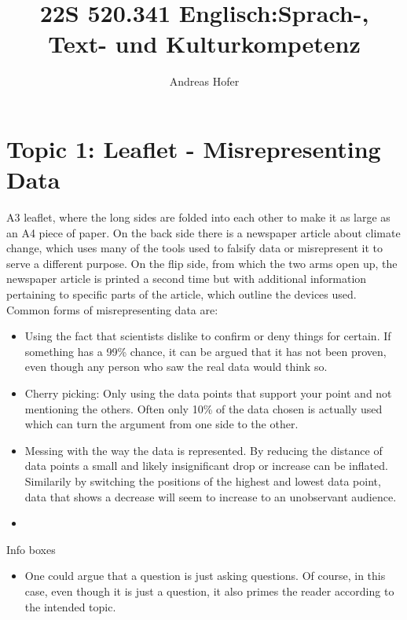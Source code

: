 \documentclass{article}
\title{\vspace{-3cm}22S 520.341 Englisch:Sprach-, Text- und Kulturkompetenz}
\author{Andreas Hofer}
\begin{document}
	\section*{Topic 1: Leaflet - Misrepresenting Data}
	A3 leaflet, where the long sides are folded into each other to make it as large as an A4 piece of paper. On the back side there is a newspaper article about climate change, which uses many of the tools used to falsify data or misrepresent it to serve a different purpose. On the flip side, from which the two arms open up, the newspaper article is printed a second time but with additional information pertaining to specific parts of the article, which outline the devices used. Common forms of misrepresenting data are:
	\begin{itemize}
		\item{Using the fact that scientists dislike to confirm or deny things for certain. If something has a 99\% chance, it can be argued that it has not been proven, even though any person who saw the real data would think so.}
		\item{Cherry picking: Only using the data points that support your point and not mentioning the others. Often only 10\% of the data chosen is actually used which can turn the argument from one side to the other.}
		\item{Messing with the way the data is represented. By reducing the distance of data points a small and likely insignificant drop or increase can be inflated. Similarily by switching the positions of the highest and lowest data point, data that shows a decrease will seem to increase to an unobservant audience.}
		\item{}
	\end{itemize}
	Info boxes
	\begin{itemize}
		\item{One could argue that a question is just asking questions. Of course, in this case, even though it is just a question, it also primes the reader according to the intended topic. }
	\end{itemize}
	
\end{document}
